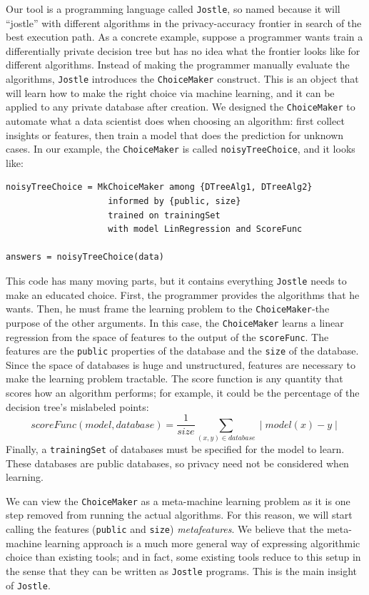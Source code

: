 \documentclass[11pt]{report}
\newcommand{\Jostle}{\texttt{Jostle}}
\renewcommand{\t}[1]{\texttt{#1}}
\begin{document}
Our tool is a programming language called \Jostle{}, so named because it will ``jostle'' with different algorithms in the privacy-accuracy frontier in search of the best execution path. As a concrete example, suppose a programmer wants train a differentially private decision tree but has no idea what the frontier looks like for different algorithms. Instead of making the programmer manually evaluate the algorithms, \Jostle{} introduces the \t{ChoiceMaker} construct. This is an object that will learn how to make the right choice via machine learning, and it can be applied to any private database after creation. We designed the \t{ChoiceMaker} to automate what a data scientist does when choosing an algorithm: first collect insights or features, then train a model that does the prediction for unknown cases. In our example, the \t{ChoiceMaker} is called \t{noisyTreeChoice}, and it looks like:
\begin{lstlisting}[style=MyPythonStyle]
noisyTreeChoice = MkChoiceMaker among {DTreeAlg1, DTreeAlg2}
                    informed by {public, size}
                    trained on trainingSet 
                    with model LinRegression and ScoreFunc

answers = noisyTreeChoice(data)
\end{lstlisting}
This code has many moving parts, but it contains everything \Jostle{} needs to make an educated choice. First, the programmer provides the algorithms that he wants. Then, he must frame the learning problem to the \t{ChoiceMaker}-the purpose of the other arguments. In this case, the \t{ChoiceMaker} learns a linear regression from the space of features to the output of the \t{scoreFunc}. The features are the \t{public} properties of the database and the \t{size} of the database. Since the space of databases is huge and unstructured, features are necessary to make the learning problem tractable. The score function is any quantity that scores how an algorithm performs; for example, it could be the percentage of the decision tree's mislabeled points:
\[
scoreFunc(model, database) = \frac{1}{size}\sum_{(x, y) \in database} \mid model(x) - y\mid
\]
Finally, a \t{trainingSet} of databases must be specified for the model to learn. These databases are public databases, so privacy need not be considered when learning.

We can view the \t{ChoiceMaker} as a meta-machine learning problem as it is one step removed from running the actual algorithms. For this reason, we will start calling the features (\t{public} and \t{size}) \emph{metafeatures}. We believe that the meta-machine learning approach is a much more general way of expressing algorithmic choice than existing tools; and in fact, some existing tools reduce to this setup in the sense that they can be written as \Jostle{} programs. This is the main insight of \Jostle{}.
\end{document}

